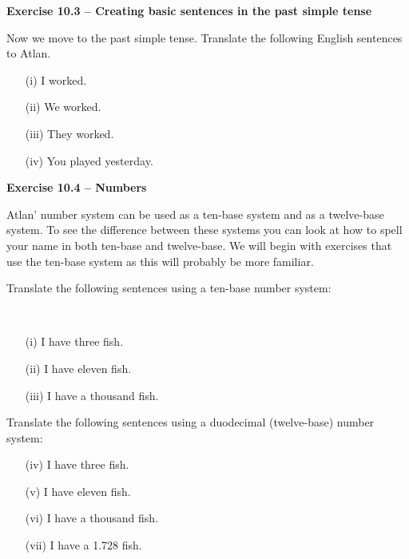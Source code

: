 \noindent \textbf{Exercise 10.3 -- Creating basic sentences in the past simple tense} 

Now we move to the past simple tense. Translate the following English sentences to Atlan. 
\begin{itemize}
    \item[(i)]I worked. 

    \item[(ii)]We worked. 

    \item[(iii)]They worked. 

    \item[(iv)]You played yesterday. 
\end{itemize}
 

\noindent \textbf{Exercise 10.4 -- Numbers} 

Atlan’ number system can be used as a ten-base system and as a twelve-base system. To see the difference between these systems you can look at how to spell your name in both ten-base and twelve-base. We will begin with exercises that use the ten-base system as this will probably be more familiar. 

\noindent Translate the following sentences using a ten-base number system:

\phantom{.}\\

\begin{itemize}
    \item[(i)]I have three fish. 

    \item[(ii)]I have eleven fish. 

    \item[(iii)]I have a thousand fish. 
\end{itemize}
\noindent Translate the following sentences using a duodecimal (twelve-base) number system:
\begin{itemize}
    \item[(iv)]I have three fish. 

    \item[(v)]I have eleven fish. 

    \item[(vi)]I have a thousand fish. 

    \item[(vii)]I have a 1.728 fish.  
\end{itemize}
 

\vfill 
\pagebreak
 

